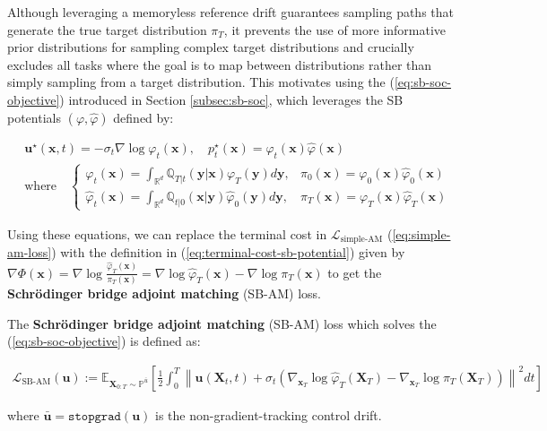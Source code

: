 \documentclass{article}
\newcommand{\boldtext}[1]{\textbf{\textcolor{MyGreen}{#1}}}
\begin{document}
Although leveraging a memoryless reference drift guarantees sampling paths that generate the true target distribution $\pi_T$, it prevents the use of more informative prior distributions for sampling complex target distributions and crucially excludes all tasks where the goal is to map between distributions rather than simply sampling from a target distribution. This motivates using the (\ref{eq:sb-soc-objective}) introduced in Section \ref{subsec:sb-soc}, which leverages the SB potentials $(\varphi, \hat{\varphi})$ defined by: 
\begin{small}
\begin{align}
    &\boldsymbol{u}^\star(\boldsymbol{x},t)=-\sigma_t\nabla \log\varphi_t(\boldsymbol{x}), \quad p_t^\star(\boldsymbol{x})=\varphi_t(\boldsymbol{x})\hat{\varphi}(\boldsymbol{x})\tag{SB Optimality}\label{eq:sb-system-adjoint}\\
    &\text{where} \quad\begin{cases}
        \varphi_t(\boldsymbol{x})=\int_{\mathbb{R}^d}\mathbb{Q}_{T|t}(\boldsymbol{y}|\boldsymbol{x})\varphi_T(\boldsymbol{y})d\boldsymbol{y}, &\pi_0(\boldsymbol{x})=\varphi_0(\boldsymbol{x})\hat{\varphi}_0(\boldsymbol{x})\\
        \hat{\varphi}_t(\boldsymbol{x})=\int_{\mathbb{R}^d}\mathbb{Q}_{t|0}(\boldsymbol{x}|\boldsymbol{y})\hat{\varphi}_0(\boldsymbol{y})d\boldsymbol{y}, &\pi_T(\boldsymbol{x})=\varphi_T(\boldsymbol{x})\hat{\varphi}_T(\boldsymbol{x})
    \end{cases}\nonumber
\end{align}
\end{small}
Using these equations, we can replace the terminal cost in $\mathcal{L}_{\text{simple-AM}}$ (\ref{eq:simple-am-loss}) with the definition in (\ref{eq:terminal-cost-sb-potential}) given by $\nabla \Phi(\boldsymbol{x})=\nabla \log \frac{\hat{\varphi}_T(\boldsymbol{x})}{\pi_T(\boldsymbol{x})}=\nabla \log \hat{\varphi}_T(\boldsymbol{x})-\nabla \log \pi_T(\boldsymbol{x})$ to get the \boldtext{Schrödinger bridge adjoint matching} (SB-AM) loss.

\begin{definition}
The \textbf{Schrödinger bridge adjoint matching} (SB-AM) loss which solves the (\ref{eq:sb-soc-objective}) is defined as:
\begin{small}
\begin{align}
    \mathcal{L}_{\text{SB-AM}}(\boldsymbol{u}):=\mathbb{E}_{\boldsymbol{X}_{0:T}\sim \mathbb{P}^{\bar{u}}}\left[\frac{1}{2}\int_0^T\left\|\boldsymbol{u}(\boldsymbol{X}_t,t)+\sigma_t(\nabla_{\boldsymbol{x}_T}\log \hat{\varphi}_T(\boldsymbol{X}_T)-\nabla_{\boldsymbol{x}_T}\log \pi_T(\boldsymbol{X}_T))\right\|^2dt\right]\tag{SB-AM Objective}\label{eq:sb-am-loss}
\end{align}
\end{small}
where $\bar{\boldsymbol{u}}=\texttt{stopgrad}(\boldsymbol{u})$ is the non-gradient-tracking control drift. 
\end{definition}
\end{document}
